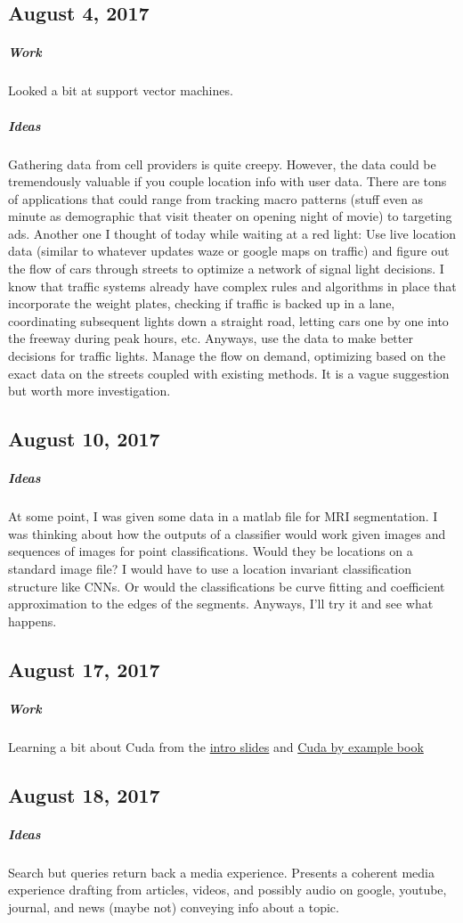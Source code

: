 \documentclass[a4paper]{article}
\begin{document}
\subsection{August 4, 2017}
\subparagraph{Work}
Looked a bit at support vector machines.
\subparagraph{Ideas}
Gathering data from cell providers is quite creepy. However, the data could be tremendously valuable if you couple location info with user data. There are tons of applications that could range from tracking macro patterns (stuff even as minute as demographic that visit theater on opening night of movie) to targeting ads. Another one I thought of today while waiting at a red light: Use live location data (similar to whatever updates waze or google maps on traffic) and figure out the flow of cars through streets to optimize a network of signal light decisions. I know that traffic systems already have complex rules and algorithms in place that incorporate the weight plates, checking if traffic is backed up in a lane, coordinating subsequent lights down a straight road, letting cars one by one into the freeway during peak hours, etc. Anyways, use the data to make better decisions for traffic lights. Manage the flow on demand, optimizing based on the exact data on the streets coupled with existing methods. It is a vague suggestion but worth more investigation.

\subsection{August 10, 2017}
\subparagraph{Ideas}
At some point, I was given some data in a matlab file for MRI segmentation. I was thinking about how the outputs of a classifier would work given images and sequences of images for point classifications. Would they be locations on a standard image file? I would have to use a location invariant classification structure like CNNs. Or would the classifications be curve fitting and coefficient approximation to the edges of the segments. Anyways, I'll try it and see what happens. 

\subsection{August 17, 2017}
\subparagraph{Work}
Learning a bit about Cuda from the \href{http://www.nvidia.com/docs/IO/116711/sc11-cuda-c-basics.pdf}{intro slides} and \href{https://developer.nvidia.com/cuda-example}{Cuda by example book}

\subsection{August 18, 2017}
\subparagraph{Ideas}
Search but queries return back a media experience. Presents a coherent media experience drafting from articles, videos, and possibly audio on google, youtube, journal, and news (maybe not) conveying info about a topic.
\end{document}
